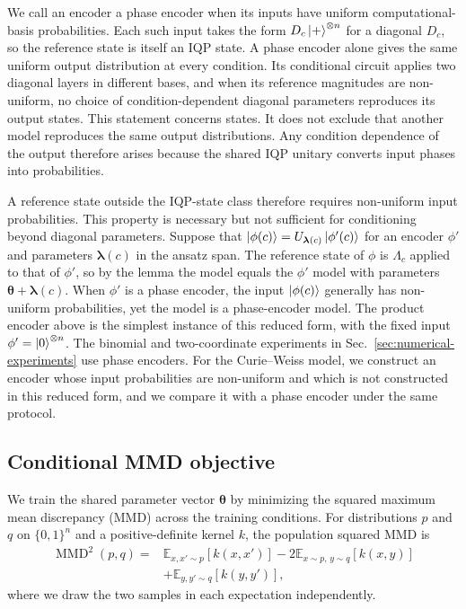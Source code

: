 \documentclass[pra,aps,10pt,twocolumn,floatfix,superscriptaddress, notitlepage,longbibliography]{revtex4-2}
\newcommand{\E}{\mathbb{E}}
\newcommand{\mmd}{\operatorname{MMD}}
\begin{document}
We call an encoder a phase encoder when its inputs have uniform computational-basis probabilities. Each such input takes the form $D_c\ket{+}^{\otimes n}$ for a diagonal $D_c$, so the reference state is itself an IQP state. A phase encoder alone gives the same uniform output distribution at every condition. Its conditional circuit applies two diagonal layers in different bases, and when its reference magnitudes are non-uniform, no choice of condition-dependent diagonal parameters reproduces its output states. This statement concerns states. It does not exclude that another model reproduces the same output distributions. Any condition dependence of the output therefore arises because the shared IQP unitary converts input phases into probabilities.

A reference state outside the IQP-state class therefore requires non-uniform input probabilities. This property is necessary but not sufficient for conditioning beyond diagonal parameters. Suppose that $\ket{\phi(c)}=U_{\boldsymbol\lambda(c)}\ket{\phi'(c)}$ for an encoder $\phi'$ and parameters $\boldsymbol\lambda(c)$ in the ansatz span. The reference state of $\phi$ is $\Lambda_c$ applied to that of $\phi'$, so by the lemma the model equals the $\phi'$ model with parameters $\boldsymbol\theta+\boldsymbol\lambda(c)$. When $\phi'$ is a phase encoder, the input $\ket{\phi(c)}$ generally has non-uniform probabilities, yet the model is a phase-encoder model. The product encoder above is the simplest instance of this reduced form, with the fixed input $\phi'=\ket{0}^{\otimes n}$. The binomial and two-coordinate experiments in Sec.~\ref{sec:numerical-experiments} use phase encoders. For the Curie--Weiss model, we construct an encoder whose input probabilities are non-uniform and which is not constructed in this reduced form, and we compare it with a phase encoder under the same protocol.


\subsection{Conditional MMD objective}
\label{sec:cond_training}

We train the shared parameter vector $\boldsymbol{\theta}$ by minimizing the squared maximum mean discrepancy (MMD) across the training conditions. For distributions $p$ and $q$ on $\{0,1\}^n$ and a positive-definite kernel $k$, the population squared MMD is \cite{grettonKernelTwoSample2012}
\begin{equation}
\begin{aligned}
    \mmd^2(p,q)
    ={}&\E_{x,x'\sim p}[k(x,x')]
    -2\E_{x\sim p,\,y\sim q}[k(x,y)] \\
    &+\E_{y,y'\sim q}[k(y,y')],
\end{aligned}
\label{eq:mmd-population}
\end{equation}
where we draw the two samples in each expectation independently.
\end{document}
